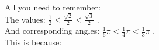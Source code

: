 \documentclass[preview]{standalone}
\begin{document}
\begin{center}
All you need to remember: \\ The values: $\frac{1}{2} < \frac{\sqrt{2}}{2} < \frac{\sqrt{3}}{2}$ . \\ And corresponding angles: $ \frac{1}{6} \pi < \frac{1}{4} \pi < \frac{1}{3} \pi $ . \\ This is because:
\end{center}
\end{document}
